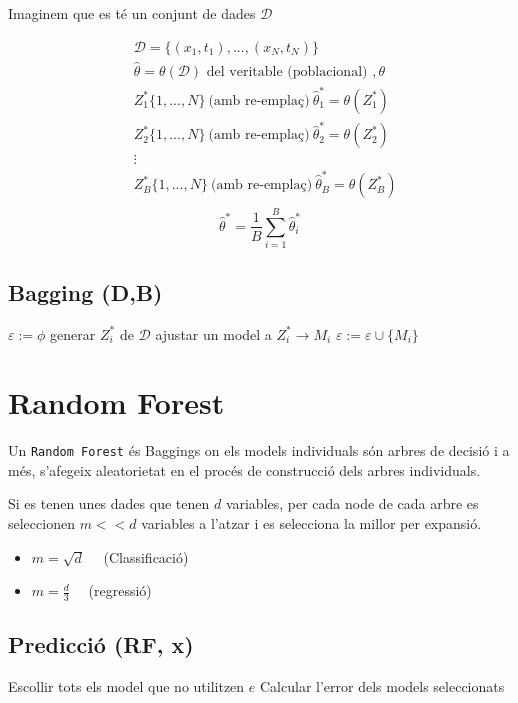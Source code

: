 Imaginem que es té un conjunt de dades $\mathcal{D}$

\begin{align*}
	&\mathcal{D} = \{ (x_1, t_1),..., (x_N, t_N) \} \\
	& \hat{\theta} = \theta(\mathcal{D}) \text{ del veritable (poblacional) }, \theta \\
	& Z_1^* \{ 1, ..., N \} \ \text{(amb re-emplaç)}\ \hat{\theta}_1^* = \theta(Z_1^*) \\
	& Z_2^* \{ 1, ..., N \} \ \text{(amb re-emplaç)}\ \hat{\theta}_2^* = \theta(Z_2^*) \\
	& \vdots \\
	& Z_B^* \{ 1, ..., N \} \ \text{(amb re-emplaç)}\ \hat{\theta}_B^* = \theta(Z_B^*) \\
\end{align*}
$$
\hat{\theta}^* = \frac{1}{B} \sum_{i=1}^B \hat{\theta}_i^*
$$


\subsection{Bagging (D,B)}
\begin{algorithmic}
	\State $\varepsilon := \phi$
		\State generar $Z_i^*$ de $\mathcal{D}$
		\State ajustar un model a $Z_i^* \to M_i$
		\State $\varepsilon := \varepsilon \cup \{ M_i \}$
	\EndFor
\end{algorithmic}


\section{Random Forest}
Un \texttt{Random Forest} és Baggings on els models individuals són arbres de decisió i a més, s'afegeix aleatorietat en el procés de construcció dels arbres individuals.

Si es tenen unes dades que tenen $d$ variables, per cada node de cada arbre es seleccionen $m << d$ variables a l'atzar i es selecciona la millor per expansió.

\begin{itemize}
	\item $m = \sqrt{d} \quad$ (Classificació)
	\item $m = \frac{d}{3} \quad$ (regressió)
\end{itemize}

\subsection{Predicció (RF, x)}
\begin{algorithmic}
		\State Escollir tots els model que no utilitzen $e$
		\State Calcular l'error dels models seleccionats
	\EndFor
\end{algorithmic}
